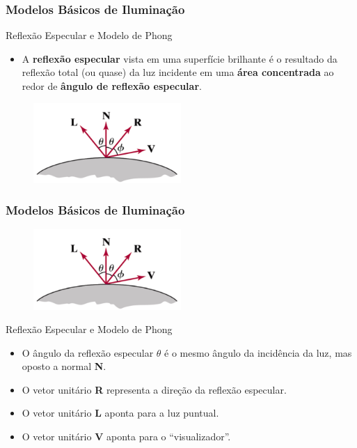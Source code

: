 \documentclass{beamer}
\begin{document}
\begin{frame}
\frametitle{Modelos Básicos de Iluminação}

	\begin{block}{Reflexão Especular e Modelo de Phong}
		\begin{itemize}
			\item A \textbf{reflexão especular}	vista em uma superfície brilhante é o resultado da reflexão total (ou quase) da luz incidente em uma \textbf{área concentrada} ao redor de \textbf{ângulo de reflexão especular}.
		\end{itemize}
	\end{block}
	
	\begin{figure}[!h]
		\begin{center}
		\includegraphics[width=0.5\textwidth]{Figures/RefEsp}
		\end{center}
	\end{figure}	

\end{frame}

\begin{frame}
\frametitle{Modelos Básicos de Iluminação}

	\begin{figure}[!h]
		\begin{center}
		\includegraphics[width=0.5\textwidth]{Figures/RefEsp}
		\end{center}
	\end{figure}	

	\begin{block}{Reflexão Especular e Modelo de Phong}
		\begin{itemize}
			\item O ângulo da reflexão especular $\theta$ é o mesmo ângulo da incidência da luz, mas oposto a normal \textbf{N}.
			\item O vetor unitário \textbf{R} representa a direção da reflexão especular.
			\item O vetor unitário \textbf{L} aponta para a luz puntual.
			\item O vetor unitário \textbf{V} aponta para o ``visualizador''. 
		\end{itemize}
	\end{block}
\end{frame}
\end{document}
